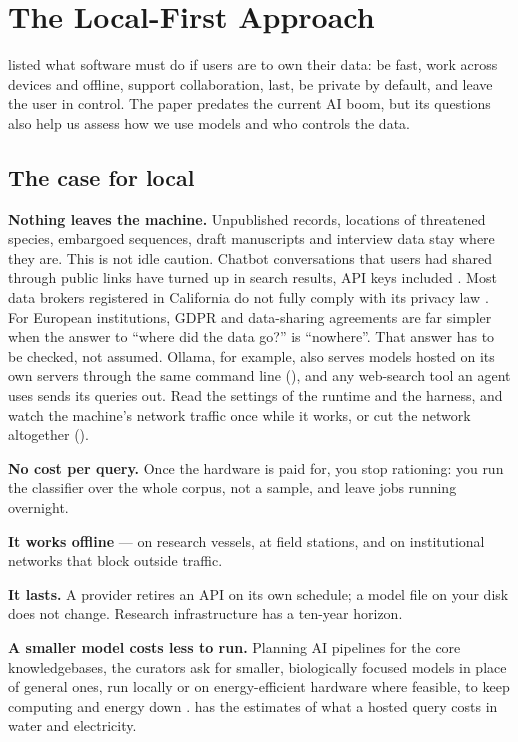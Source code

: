 \chapter{The Local-First Approach}
\label{ch:localfirst}

\textcite{kleppmann2019localfirst} listed what software must do if users are to
own their data: be fast, work across devices and offline, support
collaboration, last, be private by default, and leave the user in control. The
paper predates the current AI boom, but its questions also help us assess
how we use models and who controls the data.

\section{The case for local}

\textbf{Nothing leaves the machine.} Unpublished records, locations of
threatened species, embargoed sequences, draft manuscripts and interview data
stay where they are. This is not idle caution. Chatbot conversations that users
had shared through public links have turned up in search results, API keys
included \parencite{ibtimes2026claudechats}. Most data brokers registered in
California do not fully comply with its privacy law
\parencite{hai2026privacylaws}. For European institutions, GDPR and
data-sharing agreements are far simpler when the answer to ``where did the data
go?'' is ``nowhere''. That answer has to be checked, not assumed. Ollama, for
example, also serves models hosted on its own servers through the same command
line (), and any web-search tool an agent uses sends its queries
out. Read the settings of the runtime and the harness, and watch the machine's
network traffic once while it works, or cut the network altogether
().

\textbf{No cost per query.} Once the hardware is paid for, you stop rationing:
you run the classifier over the whole corpus, not a sample, and leave jobs
running overnight.

\textbf{It works offline} --- on research vessels, at field stations, and on
institutional networks that block outside traffic.

\textbf{It lasts.} A provider retires an API on its own schedule; a model file
on your disk does not change. Research infrastructure has a ten-year horizon.

\textbf{A smaller model costs less to run.} Planning AI pipelines for the core
knowledgebases, the curators ask for smaller, biologically focused models in
place of general ones, run locally or on energy-efficient hardware where
feasible, to keep computing and energy down \parencite{pombase2026curation}.
 has the estimates of what a hosted query costs in water and
electricity.

